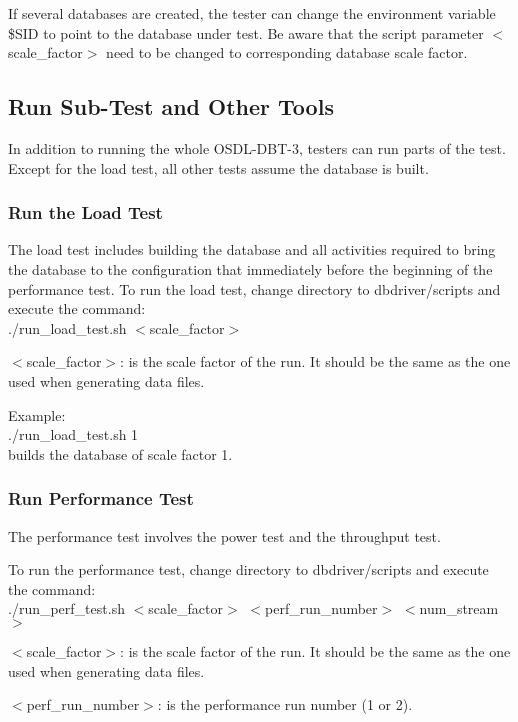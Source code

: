\documentclass{article}
\begin{document}
\noindent
If several databases are created, the tester can change the
environment variable \$SID to point to the database under test.  Be
aware that the script parameter $<$scale\_factor$>$ need to be changed to
corresponding database scale factor.

\subsection{Run Sub-Test and Other Tools}

\noindent
In addition to running the whole OSDL-DBT-3, testers can run parts of
the test.  Except for the load test, all other tests assume the
database is built.

\subsubsection{Run the Load Test}

\noindent
The load test includes building the database and all activities
required to bring the database to the configuration that immediately
before the beginning of the performance test.  To run the load test,
change directory to dbdriver/scripts and execute the command: \\
\indent ./run\_load\_test.sh  $<$scale\_factor$>$ 

\noindent
$<$scale\_factor$>$: is the scale factor of the run.  It should be the same
as the one used when generating data files.

\noindent
Example: \\
\indent ./run\_load\_test.sh 1 \\
\indent builds the database of scale factor 1.

\subsubsection{Run Performance Test}

\noindent
The performance test involves the power test and the throughput test.

\noindent
To run the performance test, change directory to dbdriver/scripts and
execute the command: \\
\indent ./run\_perf\_test.sh  $<$scale\_factor$>$ $<$perf\_run\_number$>$ $<$num\_stream$>$

\noindent
$<$scale\_factor$>$: is the scale factor of the run.  It should be the
same as the one used when generating data files.

\noindent
$<$perf\_run\_number$>$: is the performance run number (1 or 2).  
\end{document}
